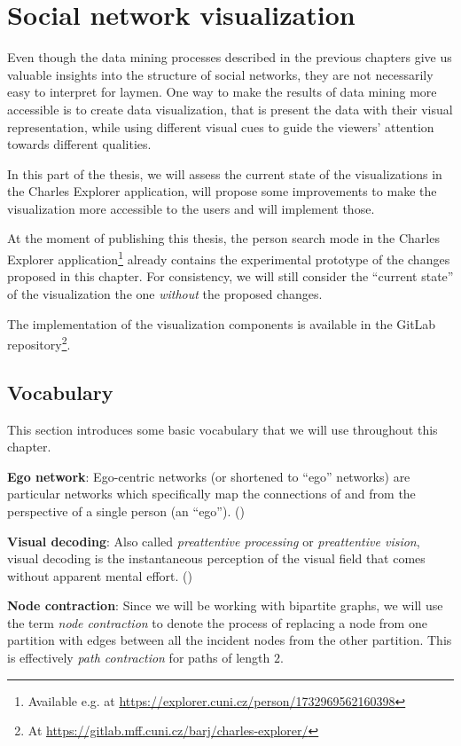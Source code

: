 \chapter{Social network visualization}

Even though the data mining processes described in the previous chapters give us valuable insights into the structure of social networks, 
they are not necessarily easy to interpret for laymen.
One way to make the results of data mining more accessible is to create data visualization, that is present the data with their visual representation, 
while using different visual cues to guide the viewers' attention towards different qualities.

In this part of the thesis, we will assess the current state of the visualizations in the Charles Explorer application, 
will propose some improvements to make the visualization more accessible to the users and will implement those.

At the moment of publishing this thesis, the person search mode in the Charles Explorer application\footnote{Available e.g. at \url{https://explorer.cuni.cz/person/1732969562160398}} already contains the experimental prototype of the changes proposed in this chapter.
For consistency, we will still consider the ``current state'' of the visualization the one \textit{without} the proposed changes.

The implementation of the visualization components is available in the GitLab repository\footnote{At \url{https://gitlab.mff.cuni.cz/barj/charles-explorer/}}.

\section{Vocabulary}

This section introduces some basic vocabulary that we will use throughout this chapter.

\textbf{Ego network}: Ego-centric networks (or shortened to “ego” networks) are particular networks which specifically map the connections of and from the perspective of a single person (an “ego”). (\cite{Lizardo2020-xo})

\textbf{Visual decoding}: Also called \textit{preattentive processing} or \textit{preattentive vision}, visual decoding is the instantaneous perception of the visual field that comes without apparent mental effort. (\cite{Cleveland1985})

\textbf{Node contraction}: Since we will be working with bipartite graphs, we will use the term \textit{node contraction} to denote the process of replacing a node from one partition with edges between all the incident nodes from the other partition.
This is effectively \textit{path contraction} for paths of length $2$.

